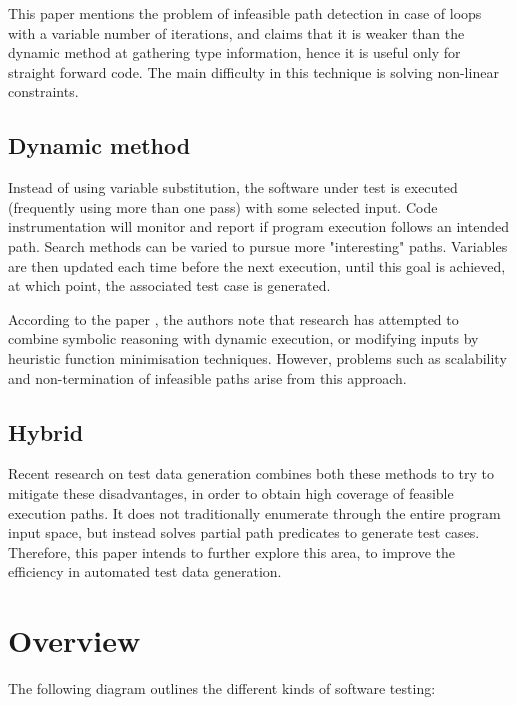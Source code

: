 \documentclass{icldt}
\numberwithin{equation}{section}       %
\begin{document}
This paper \cite{Tahbildar} mentions the problem of infeasible path detection in case of loops with a variable number of iterations, and claims that it is weaker than the dynamic method at gathering type information, hence it is useful only for straight forward code. The main difficulty in this technique is solving non-linear constraints.

\subsection{Dynamic method}
Instead of using variable substitution, the software under test is executed (frequently using more than one pass) with some selected input. Code instrumentation will monitor and report if program execution follows an intended path. Search methods can be varied to pursue more "interesting" paths. Variables are then updated each time before the next execution, until this goal is achieved, at which point, the associated test case is generated.

According to the paper \cite{Tahbildar}, the authors note that research has attempted to combine symbolic reasoning with dynamic execution, or modifying inputs by heuristic function minimisation techniques. However, problems such as scalability and non-termination of infeasible paths arise from this approach.

\subsection{Hybrid}
Recent research on test data generation combines both these methods to try to mitigate these disadvantages, in order to obtain high coverage of feasible execution paths. It does not traditionally enumerate through the entire program input space, but instead solves partial path predicates to generate test cases. Therefore, this paper intends to further explore this area, to improve the efficiency in automated test data generation.
\section{Overview}
\label{sect:overview}
The following diagram \cite{McMinn2004} outlines the different kinds of software testing:
\end{document}
